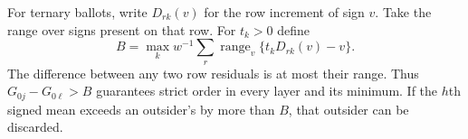 For ternary ballots, write $D_{rk}(v)$ for the row increment of sign $v$. Take the range over signs present on that row. For $t_k>0$ define
\[
 B=\max_k w^{-1}\sum_r\operatorname{range}_{v}\{t_k D_{rk}(v)-v\}.
\]
The difference between any two row residuals is at most their range. Thus $G_{0j}-G_{0\ell}>B$ guarantees strict order in every layer and its minimum. If the $h$th signed mean exceeds an outsider's by more than $B$, that outsider can be discarded.
